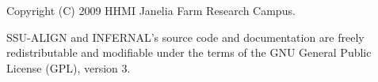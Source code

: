 \vspace*{\fill}
\begin{flushleft}
Copyright (C) 2009 HHMI Janelia Farm Research Campus.

\vspace{2em} 

SSU-ALIGN and INFERNAL's source code and documentation are freely
redistributable and modifiable under the terms of the GNU General
Public License (GPL), version 3.
\end{flushleft}
